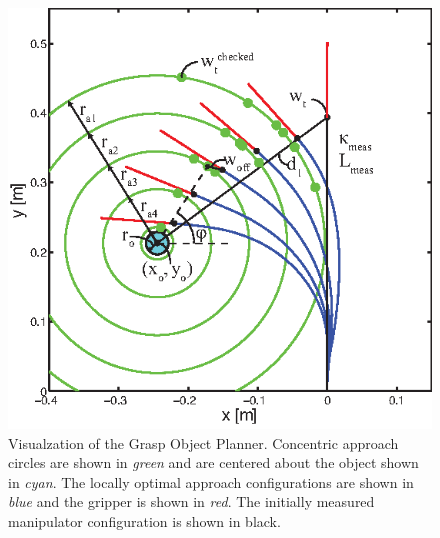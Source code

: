 \begin{figure}[htpb]
\centering
   \includegraphics[width=0.85\columnwidth, trim = 0mm 0mm 5mm 5mm, clip]{Figures/processing_control/grasp_object_planner.eps}
   \caption{Visualzation of the Grasp Object Planner. Concentric approach circles are shown in \emph{green} and are centered about the object shown in \emph{cyan}. The locally optimal approach configurations are shown in \emph{blue} and the gripper is shown in \emph{red}. The initially measured manipulator configuration is shown in black.}
   \label{fig:planGrasp}
\end{figure}

